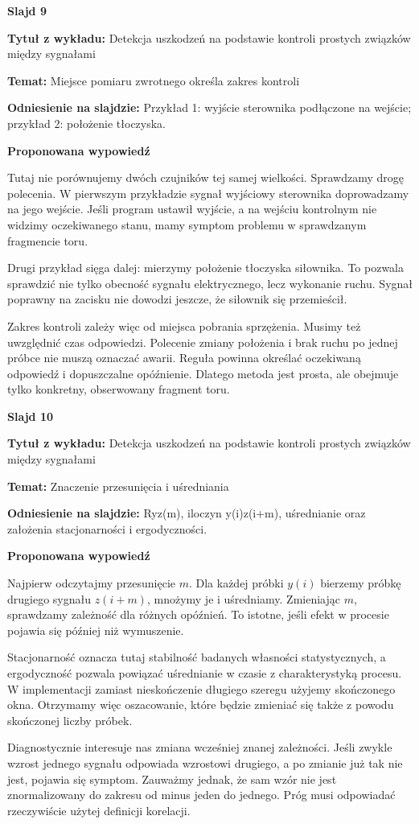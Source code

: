 \documentclass[a4paper,11pt]{article}
\newcommand{\NumerSlajdu}{1}
\newcommand{\Komentarz}[3]{%
  \gdef\NumerSlajdu{#1}%
  {\Large\bfseries Slajd #1\par}\smallskip
  \textbf{Tytuł z wykładu:} #2\par
  \textbf{Temat:} #3\par\medskip
}
\begin{document}
\Komentarz{9}{Detekcja uszkodzeń na podstawie kontroli prostych związków między sygnałami}{Miejsce pomiaru zwrotnego określa zakres kontroli}
{\small\color{black!65}\textbf{Odniesienie na slajdzie:} Przykład 1: wyjście sterownika podłączone na wejście; przykład 2: położenie tłoczyska.\par}
\medskip
\textbf{Proponowana wypowiedź}\par
Tutaj nie porównujemy dwóch czujników tej samej wielkości. Sprawdzamy drogę polecenia. W pierwszym przykładzie sygnał wyjściowy sterownika doprowadzamy na jego wejście. Jeśli program ustawił wyjście, a na wejściu kontrolnym nie widzimy oczekiwanego stanu, mamy symptom problemu w sprawdzanym fragmencie toru.

Drugi przykład sięga dalej: mierzymy położenie tłoczyska siłownika. To pozwala sprawdzić nie tylko obecność sygnału elektrycznego, lecz wykonanie ruchu. Sygnał poprawny na zacisku nie dowodzi jeszcze, że siłownik się przemieścił.

Zakres kontroli zależy więc od miejsca pobrania sprzężenia. Musimy też uwzględnić czas odpowiedzi. Polecenie zmiany położenia i brak ruchu po jednej próbce nie muszą oznaczać awarii. Reguła powinna określać oczekiwaną odpowiedź i dopuszczalne opóźnienie. Dlatego metoda jest prosta, ale obejmuje tylko konkretny, obserwowany fragment toru.
\clearpage

\Komentarz{10}{Detekcja uszkodzeń na podstawie kontroli prostych związków między sygnałami}{Znaczenie przesunięcia i uśredniania}
{\small\color{black!65}\textbf{Odniesienie na slajdzie:} Ryz(m), iloczyn y(i)z(i+m), uśrednianie oraz założenia stacjonarności i ergodyczności.\par}
\medskip
\textbf{Proponowana wypowiedź}\par
Najpierw odczytajmy przesunięcie $m$. Dla każdej próbki $y(i)$ bierzemy próbkę drugiego sygnału $z(i+m)$, mnożymy je i uśredniamy. Zmieniając $m$, sprawdzamy zależność dla różnych opóźnień. To istotne, jeśli efekt w procesie pojawia się później niż wymuszenie.

Stacjonarność oznacza tutaj stabilność badanych własności statystycznych, a ergodyczność pozwala powiązać uśrednianie w czasie z charakterystyką procesu. W implementacji zamiast nieskończenie długiego szeregu użyjemy skończonego okna. Otrzymamy więc oszacowanie, które będzie zmieniać się także z powodu skończonej liczby próbek.

Diagnostycznie interesuje nas zmiana wcześniej znanej zależności. Jeśli zwykle wzrost jednego sygnału odpowiada wzrostowi drugiego, a po zmianie już tak nie jest, pojawia się symptom. Zauważmy jednak, że sam wzór nie jest znormalizowany do zakresu od minus jeden do jednego. Próg musi odpowiadać rzeczywiście użytej definicji korelacji.
\end{document}
